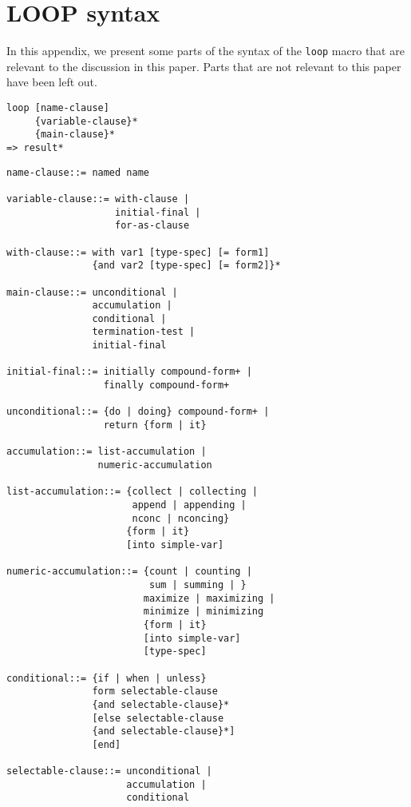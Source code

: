 \appendix

\section{LOOP syntax}

In this appendix, we present some parts of the syntax of the
\texttt{loop} macro that are relevant to the discussion in this paper.
Parts that are not relevant to this paper have been left out.

\begin{verbatim}
loop [name-clause] 
     {variable-clause}* 
     {main-clause}* 
=> result*
\end{verbatim}

\begin{verbatim}
name-clause::= named name 

variable-clause::= with-clause | 
                   initial-final | 
                   for-as-clause 

with-clause::= with var1 [type-spec] [= form1] 
               {and var2 [type-spec] [= form2]}* 

main-clause::= unconditional | 
               accumulation | 
               conditional | 
               termination-test | 
               initial-final 

initial-final::= initially compound-form+ | 
                 finally compound-form+ 

unconditional::= {do | doing} compound-form+ | 
                 return {form | it} 

accumulation::= list-accumulation | 
                numeric-accumulation 

list-accumulation::= {collect | collecting | 
                      append | appending | 
                      nconc | nconcing} 
                     {form | it}  
                     [into simple-var] 

numeric-accumulation::= {count | counting | 
                         sum | summing | } 
                        maximize | maximizing | 
                        minimize | minimizing 
                        {form | it} 
                        [into simple-var] 
                        [type-spec] 

conditional::= {if | when | unless} 
               form selectable-clause 
               {and selectable-clause}*  
               [else selectable-clause 
               {and selectable-clause}*]  
               [end] 

selectable-clause::= unconditional | 
                     accumulation | 
                     conditional 


\end{verbatim}
